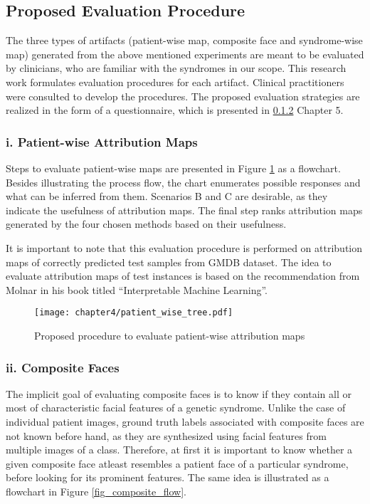 \documentclass[../report.tex]{subfiles}
\begin{document}
    \subsection{Proposed Evaluation Procedure}
    The three types of artifacts (patient-wise map, composite face and syndrome-wise map) generated from the above mentioned experiments are meant to be evaluated by clinicians, who are familiar with the syndromes in our scope. This research work formulates evaluation procedures for each artifact. Clinical practitioners were consulted to develop the procedures. The proposed evaluation strategies are realized in the form of a questionnaire, which is presented in \ref{} Chapter 5. 
    \subsubsection{i. Patient-wise Attribution Maps}
    Steps to evaluate patient-wise maps are presented in Figure \ref{fig_patient_flow} as a flowchart. Besides illustrating the process flow, the chart enumerates possible responses and what can be inferred from them. Scenarios B and C are desirable, as they indicate the usefulness of attribution maps. The final step ranks attribution maps generated by the four chosen methods based on their usefulness.
    
    It is important to note that this evaluation procedure is performed on attribution maps of correctly predicted test samples from GMDB dataset. The idea to evaluate attribution maps of test instances is based on the recommendation from Molnar in his book titled \enquote{Interpretable Machine Learning}\cite{molnar2019}.
    
     \begin{figure}[H]
     	\hspace*{1cm}    
    	\texttt{[image: chapter4/patient\_wise\_tree.pdf]}
    	\vspace*{1cm}
   	    \caption{Proposed procedure to evaluate patient-wise attribution maps}
		\label{fig_patient_flow}
    \end{figure}

	\subsubsection{ii. Composite Faces}
	The implicit goal of evaluating composite faces is to know if they contain all or most of characteristic facial features of a genetic syndrome. Unlike the case of individual patient images, ground truth labels associated with composite faces are not known before hand, as they are synthesized using facial features from multiple images of a class. Therefore, at first it is important to know whether a given composite face atleast resembles a patient face of a particular syndrome, before looking for its prominent features. The same idea is illustrated as a flowchart in Figure \ref{fig_composite_flow}. 
	
\end{document}
